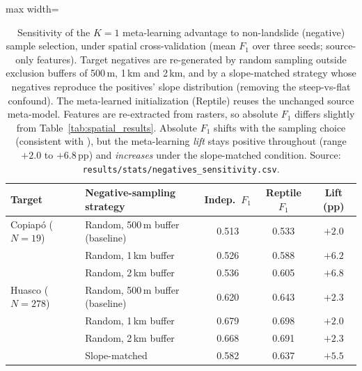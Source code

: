 \begin{table}[ht]
    \centering
    \caption{Sensitivity of the $K=1$ meta-learning advantage to non-landslide (negative) sample selection, under spatial cross-validation (mean $F_1$ over three seeds; source-only features). Target negatives are re-generated by random sampling outside exclusion buffers of 500\,m, 1\,km and 2\,km, and by a slope-matched strategy whose negatives reproduce the positives' slope distribution (removing the steep-vs-flat confound). The meta-learned initialization (Reptile) reuses the unchanged source meta-model. Features are re-extracted from rasters, so absolute $F_1$ differs slightly from Table~\ref{tab:spatial_results}. Absolute $F_1$ shifts with the sampling choice (consistent with \citealt{abdelkader2025nonlandslide}), but the meta-learning \emph{lift} stays positive throughout (range $+2.0$ to $+6.8$\,pp) and \emph{increases} under the slope-matched condition. Source: \texttt{results/stats/negatives\_sensitivity.csv}.}
    \label{tab:neg_sensitivity}
    \footnotesize
    \begin{adjustbox}{max width=\textwidth}
    \begin{tabular}{llccc}
        \toprule
        \textbf{Target} & \textbf{Negative-sampling strategy} & \textbf{Indep.\ $F_1$} & \textbf{Reptile $F_1$} & \textbf{Lift (pp)} \\
        \midrule
        Copiap\'o ($N=19$) & Random, 500\,m buffer (baseline) & 0.513 & 0.533 & $+2.0$ \\
         & Random, 1\,km buffer & 0.526 & 0.588 & $+6.2$ \\
         & Random, 2\,km buffer & 0.536 & 0.605 & $+6.8$ \\
        \midrule
        Huasco ($N=278$) & Random, 500\,m buffer (baseline) & 0.620 & 0.643 & $+2.3$ \\
         & Random, 1\,km buffer & 0.679 & 0.698 & $+2.0$ \\
         & Random, 2\,km buffer & 0.668 & 0.691 & $+2.3$ \\
         & Slope-matched & 0.582 & 0.637 & $+5.5$ \\
        \bottomrule
    \end{tabular}
    \end{adjustbox}
\end{table}
